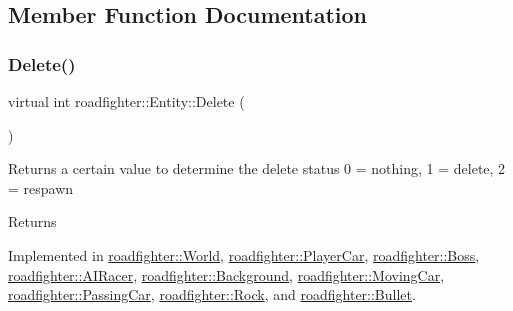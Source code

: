 \subsection{Member Function Documentation}
\mbox{\label{classroadfighter_1_1Entity_a08190b0b8e6a3fcdb42273d6096152ac}} 
\subsubsection{\texorpdfstring{Delete()}{Delete()}}
{\footnotesize\ttfamily virtual int roadfighter\+::\+Entity\+::\+Delete (\begin{DoxyParamCaption}{ }\end{DoxyParamCaption})\hspace{0.3cm}{\ttfamily [pure virtual]}}

Returns a certain value to determine the delete status 0 = nothing, 1 = delete, 2 = respawn \begin{DoxyReturn}{Returns}

\end{DoxyReturn}


Implemented in \hyperlink{classroadfighter_1_1World_a2db677b750afc0bf4f706f4cd930cb02}{roadfighter\+::\+World}, \hyperlink{classroadfighter_1_1PlayerCar_a1c4a181eee7a89315680eca4892ebc32}{roadfighter\+::\+Player\+Car}, \hyperlink{classroadfighter_1_1Boss_a8ffadaa85b61447da023c043d3d2dcc9}{roadfighter\+::\+Boss}, \hyperlink{classroadfighter_1_1AIRacer_af6fe47885c72aeddd02d13e136f4790f}{roadfighter\+::\+A\+I\+Racer}, \hyperlink{classroadfighter_1_1Background_a6541d509079dfa940d9f7ec2ab706963}{roadfighter\+::\+Background}, \hyperlink{classroadfighter_1_1MovingCar_a97196aa72de773ac88d1df99c47a5367}{roadfighter\+::\+Moving\+Car}, \hyperlink{classroadfighter_1_1PassingCar_a1a2838de0992a6e46793d0fe0f128b36}{roadfighter\+::\+Passing\+Car}, \hyperlink{classroadfighter_1_1Rock_a7ac4934b909f1f988b64ac8afc84ea85}{roadfighter\+::\+Rock}, and \hyperlink{classroadfighter_1_1Bullet_a011f2271222e0fa9bcf25193c2b94932}{roadfighter\+::\+Bullet}.

\mbox{\label{classroadfighter_1_1Entity_ac516f8005f969ad5a86c252e5a3640ee}} 
